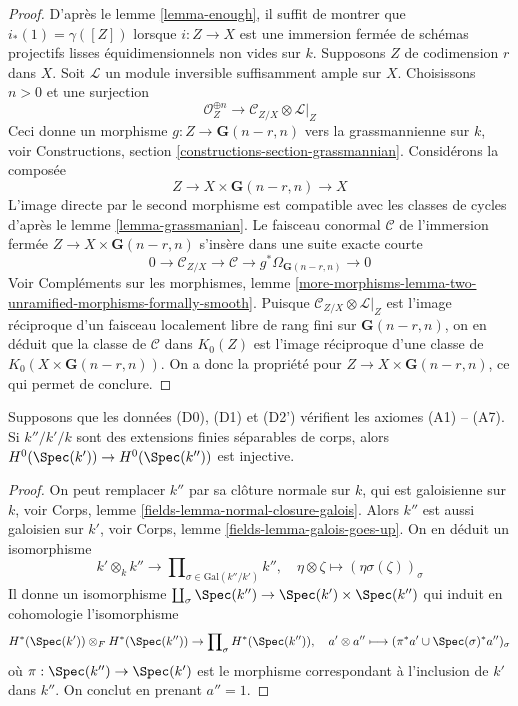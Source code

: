 \begin{proof}
D'après le lemme \ref{lemma-enough}, il suffit de montrer que $i_*(1) = \gamma([Z])$
lorsque $i : Z \to X$ est une immersion fermée de schémas
projectifs lisses équidimensionnels non vides
sur $k$. Supposons $Z$ de codimension $r$ dans $X$.
Soit $\mathcal{L}$ un module inversible suffisamment ample sur $X$.
Choisissons $n > 0$ et une surjection
$$
\mathcal{O}_Z^{\oplus n} \to \mathcal{C}_{Z/X} \otimes \mathcal{L}|_Z
$$
Ceci donne un morphisme $g : Z \to \mathbf{G}(n - r, n)$
vers la grassmannienne sur $k$, voir
Constructions, section \ref{constructions-section-grassmannian}.
Considérons la composée
$$
Z \to X \times \mathbf{G}(n - r, n) \to X
$$
L'image directe par le second morphisme est compatible avec les classes
de cycles d'après le lemme \ref{lemma-grassmanian}. Le faisceau conormal $\mathcal{C}$
de l'immersion fermée $Z \to X \times \mathbf{G}(n - r, n)$ s'insère dans
une suite exacte courte
$$
0 \to \mathcal{C}_{Z/X} \to \mathcal{C} \to
g^*\Omega_{\mathbf{G}(n - r, n)} \to 0
$$
Voir Compléments sur les morphismes, lemme
\ref{more-morphisms-lemma-two-unramified-morphisms-formally-smooth}.
Puisque $\mathcal{C}_{Z/X} \otimes \mathcal{L}|_Z$ est l'image
réciproque d'un faisceau localement libre de rang fini sur $\mathbf{G}(n - r, n)$,
on en déduit que la classe de $\mathcal{C}$ dans $K_0(Z)$
est l'image réciproque d'une classe de $K_0(X \times \mathbf{G}(n - r, n))$.
On a donc la propriété pour $Z \to X \times \mathbf{G}(n - r, n)$,
ce qui permet de conclure.
\end{proof}

\begin{lemma}
\label{lemma-injective-H0}
Supposons que les données (D0), (D1) et (D2') vérifient les axiomes (A1) -- (A7).
Si $k''/k'/k$ sont des extensions finies séparables de corps, alors
$H^0(\Spec(k')) \to H^0(\Spec(k''))$ est injective.
\end{lemma}

\begin{proof}
On peut remplacer $k''$ par sa clôture normale sur $k$,
qui est galoisienne sur $k$, voir
Corps, lemme \ref{fields-lemma-normal-closure-galois}.
Alors $k''$ est aussi galoisien sur $k'$, voir
Corps, lemme \ref{fields-lemma-galois-goes-up}.
On en déduit un isomorphisme
$$
k' \otimes_k k'' \longrightarrow
\prod\nolimits_{\sigma \in \text{Gal}(k''/k')} k'',\quad
\eta \otimes \zeta \longmapsto (\eta \sigma(\zeta))_\sigma
$$
Il donne un isomorphisme
$\coprod_\sigma \Spec(k'') \to \Spec(k') \times \Spec(k'')$
qui induit en cohomologie l'isomorphisme
$$
H^*(\Spec(k')) \otimes_F H^*(\Spec(k''))
\to
\prod\nolimits_\sigma H^*(\Spec(k'')),\quad
a' \otimes a'' \longmapsto (\pi^*a' \cup \Spec(\sigma)^*a'')_\sigma
$$
où $\pi : \Spec(k'') \to \Spec(k')$ est le morphisme
correspondant à l'inclusion de $k'$ dans $k''$.
On conclut en prenant $a'' = 1$.
\end{proof}

